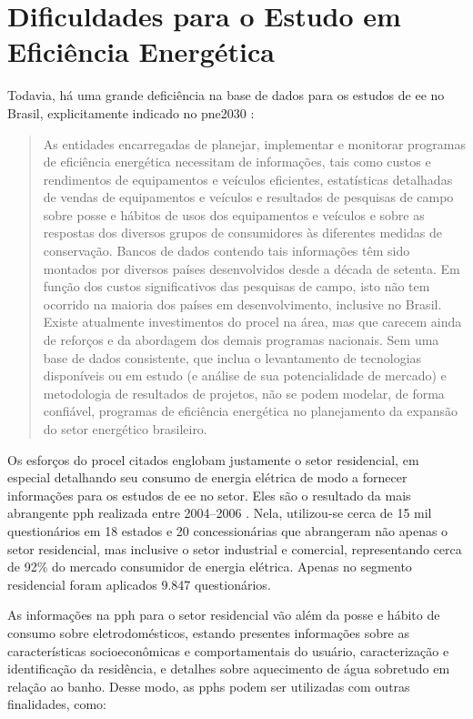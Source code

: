 \section{Dificuldades para o Estudo em Eficiência Energética}
\label{sec:ee_dificuldades}

Todavia, há uma grande deficiência na base de dados para os estudos de
\gls{ee} no Brasil, explicitamente indicado no \gls{pne2030}
\cite[p.~232]{pne30_eff_energ}:

\begin{quote}
As entidades encarregadas de planejar, implementar e monitorar
programas de eficiência energética necessitam de informações, tais
como custos e rendimentos de equipamentos e veículos eficientes,
estatísticas detalhadas de vendas de equipamentos e veículos e
resultados de pesquisas de campo sobre posse e hábitos de usos dos
equipamentos e veículos e sobre as respostas dos diversos grupos de
consumidores às diferentes medidas de conservação. Bancos de dados
contendo tais informações têm sido montados por diversos países
desenvolvidos desde a década de setenta. Em função dos custos
significativos das pesquisas de campo, isto não tem ocorrido na
maioria dos países em desenvolvimento, inclusive no Brasil. Existe
atualmente investimentos do \gls{procel} na área, mas que carecem
ainda de reforços e da abordagem dos demais programas nacionais. Sem
uma base de dados consistente, que inclua o levantamento de
tecnologias disponíveis ou em estudo (e análise de sua potencialidade
de mercado) e metodologia de resultados de projetos, não se podem
modelar, de forma confiável, programas de eficiência energética no
planejamento da expansão do setor energético brasileiro.
\end{quote}

Os esforços do \gls{procel} citados englobam justamente o setor
residencial, em especial detalhando seu consumo de energia elétrica de
modo a fornecer informações para os estudos de \gls{ee} no setor. Eles
são o resultado da mais abrangente \gls{pph} realizada entre
2004--2006 \cite{result_procel_2005,site_pesquisas_procel}.  Nela,
utilizou-se cerca de 15 mil questionários em 18 estados e 20
concessionárias que abrangeram não apenas o setor residencial, mas
inclusive o setor industrial e comercial, representando cerca de 92\%
do mercado consumidor de energia elétrica.  Apenas no segmento
residencial foram aplicados 9.847 questionários.  

As informações na \gls{pph} para o setor residencial vão além da posse
e hábito de consumo sobre eletrodomésticos, estando presentes
informações sobre as características socioeconômicas e comportamentais
do usuário, caracterização e identificação da residência, e detalhes
sobre aquecimento de água sobretudo em relação ao banho. Desse modo,
as \glspl{pph} podem ser utilizadas com outras finalidades, como:

